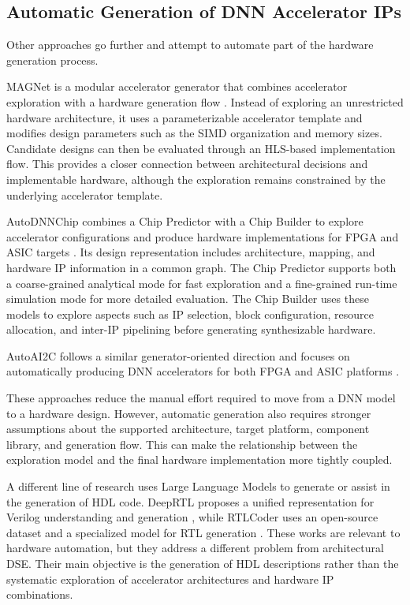 \subsection{Automatic Generation of DNN Accelerator IPs}

Other approaches go further and attempt to automate part of the
hardware generation process.

MAGNet is a modular accelerator generator that combines accelerator
exploration with a hardware generation flow \cite{magnet}. Instead of
exploring an unrestricted hardware architecture, it uses a
parameterizable accelerator template and modifies design parameters
such as the SIMD organization and memory sizes. Candidate designs can
then be evaluated through an HLS-based implementation flow. This
provides a closer connection between architectural decisions and
implementable hardware, although the exploration remains constrained
by the underlying accelerator template.

AutoDNNChip combines a Chip Predictor with a Chip Builder to explore
accelerator configurations and produce hardware implementations for
FPGA and ASIC targets \cite{autodnnchip}. Its design representation
includes architecture, mapping, and hardware IP information in a
common graph. The Chip Predictor supports both a coarse-grained
analytical mode for fast exploration and a fine-grained run-time
simulation mode for more detailed evaluation. The Chip Builder uses
these models to explore aspects such as IP selection, block
configuration, resource allocation, and inter-IP pipelining before
generating synthesizable hardware.

AutoAI2C follows a similar generator-oriented direction and focuses on
automatically producing DNN accelerators for both FPGA and ASIC
platforms \cite{autoai2c}.

These approaches reduce the manual effort required to move from a DNN
model to a hardware design. However, automatic generation also
requires stronger assumptions about the supported architecture,
target platform, component library, and generation flow. This can make
the relationship between the exploration model and the final hardware
implementation more tightly coupled.

A different line of research uses Large Language Models to generate
or assist in the generation of HDL code. DeepRTL proposes a unified
representation for Verilog understanding and generation
\cite{deeprtl}, while RTLCoder uses an open-source dataset and a
specialized model for RTL generation \cite{liu2025rtlcoder}. These
works are relevant to hardware automation, but they address a
different problem from architectural DSE. Their main objective is the
generation of HDL descriptions rather than the systematic exploration
of accelerator architectures and hardware IP combinations.

